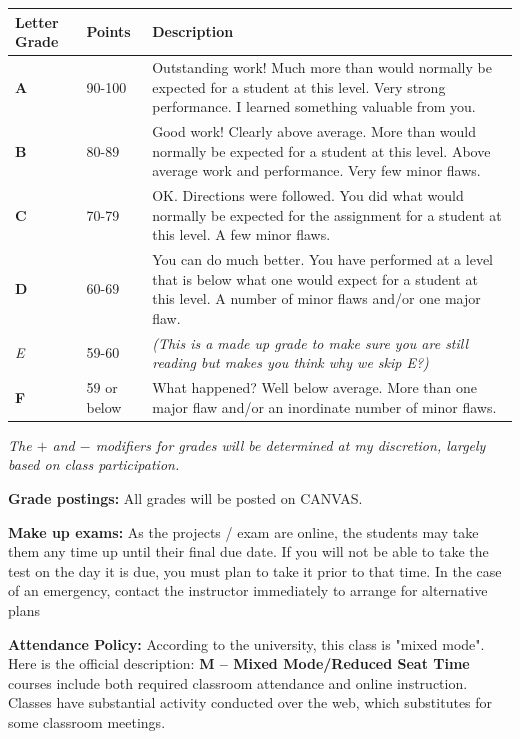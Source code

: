 \documentclass[paper=letter, fontsize=12pt]{article}
\begin{document}
\begin{table}[h!]
	\centering
	\label{my-label}
	\begin{tabular}{|l|l|p{95mm}|}\hline
		\textbf{Letter Grade} & \textbf{Points} & \textbf{Description} \\ \hline
		\textbf{A} & 90-100 & Outstanding work! Much more than would normally be expected for a student at this level. Very strong performance. I learned something valuable from you. \\ \hline
		\textbf{B} & 80-89 & Good work! Clearly above average. More than would normally be expected for a student at this level. Above average work and performance. Very few minor flaws.\\ \hline
		\textbf{C} & 70-79 & OK. Directions were followed. You did what would normally be expected for the	assignment for a student at this level. A few minor flaws. \\ \hline
		\textbf{D} & 60-69 & You can do much better. You have performed at a level that is below what one would expect for a student at this level. A number of minor flaws and/or one major flaw. \\ \hline
		\textit{E} & 59-60 & \textit{(This is a made up grade to make sure you are still reading but makes you think why we skip E?) }\\ \hline
		\textbf{F} & 59 or below & What happened? Well below average. More than one major flaw and/or an inordinate	number of minor flaws. \\ \hline
  		
	\end{tabular}
\end{table}

\textit{The $+$ and $-$ modifiers for grades will be determined at my discretion, largely based on class participation.}

\textcolor{myRed}{\textbf{Grade postings:}} All grades will be posted on CANVAS.

\textcolor{myRed}{\textbf{Make up exams:}} As the projects / exam are online, the students may take them any time up until their final due date. If you will not be
able to take the test on the day it is due, you must plan to take it prior to that time. In the case of an emergency, contact the instructor immediately to arrange for alternative plans

\textcolor{myRed}{\textbf{Attendance Policy:}} According to the university, this class is "mixed mode". Here is the official description:
 \textbf{M – Mixed Mode/Reduced Seat Time} courses include both required classroom attendance and online instruction. Classes have substantial activity conducted over the web, which substitutes for some classroom meetings.
 
\end{document}

